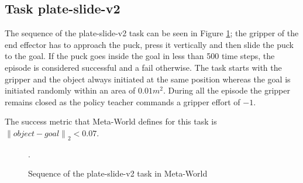 \subsection{Task plate-slide-v2}
\label{subsection:metaworld-hockey-task}

The sequence of the plate-slide-v2 task can be seen in Figure \ref{fig:sequence-plate-slide}; the gripper of the end effector has to approach the puck, press it vertically and then slide the puck to the goal. If the puck goes inside the goal in less than 500 time steps, the episode is considered successful and a fail otherwise. The task starts with the gripper and the object always initiated at the same position whereas the goal is initiated randomly within an area of  $0.01m^2$. During all the episode the gripper remains closed as the policy teacher commands a gripper effort of $-1$.


The success metric that Meta-World defines for this task is ${\left\lVert object-goal \right\rVert}_2 < 0.07$.

 \begin{figure}[H]
  \centering
  \hspace*{\fill}%
   \hfill
   \hfill
  \hspace*{\fill}%
  \caption{Sequence of the plate-slide-v2 task in Meta-World}.
  \label{fig:sequence-plate-slide}
\end{figure}


